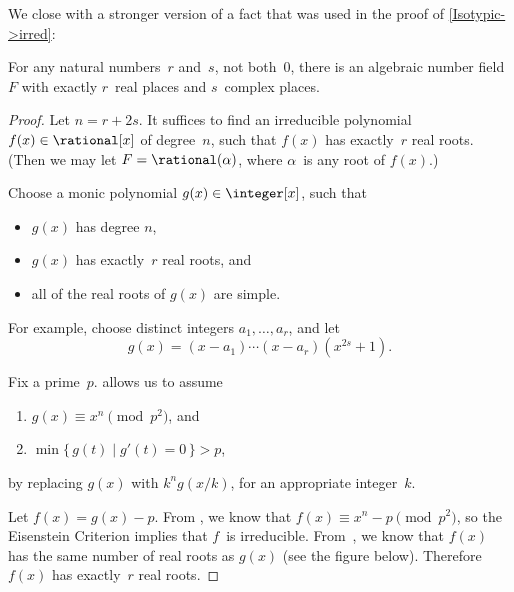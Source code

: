 We close with a stronger version of a fact that was used in the proof of \cref{Isotypic->irred}:

\begin{lem} \label{rReal+sImag}
 For any natural numbers~$r$ and~$s$, not both\/~$0$, there is
an algebraic number field~$F$ with exactly $r$~real places
and $s$~complex places.
 \end{lem}

\begin{proof}
 Let $n = r + 2s$. It suffices to find an irreducible
polynomial $f(x) \in \rational[x]$ of degree~$n$, such
that $f(x)$ has exactly~$r$ real roots. (Then we may let $F
= \rational(\alpha)$, where $\alpha$~is any root of $f(x)$.)

Choose a monic polynomial $g(x) \in \integer[x]$, such that
\noprelistbreak
	 \begin{itemize}
	 \item $g(x)$ has degree $n$,
	 \item $g(x)$ has exactly~$r$ real roots, and
	 \item all of the real roots of $g(x)$ are simple.
	 \end{itemize}
 For example, choose distinct integers
$a_1,\ldots,a_r$, and let 
	$$g(x) = (x-a_1)\cdots(x-a_r)(x^{2s}+ 1) .$$

Fix a prime~$p$.  allows us to assume
 \begin{enumerate}
 \item \label{rReal+sImagPf-modp2}
 $g(x) \equiv x^n \pmod{p^2}$, and
 \item \label{rReal+sImagPf-critpt}
 $\min \{\, g(t) \mid g'(t) = 0 \,\} > p$,
 \end{enumerate}
by replacing $g(x)$ with $k^n g(x/k)$, for an
appropriate integer~$k$.

 Let $f(x) = g(x) - p$. From  , we
know that $f(x) \equiv x^n - p \pmod{p^2}$, so the Eisenstein
Criterion  implies that $f$~is irreducible.
From~, we know that $f(x)$ has the same number of real roots as $g(x)$ (see the figure below). %
Therefore $f(x)$ has exactly~$r$ real roots.
 \end{proof}
 
